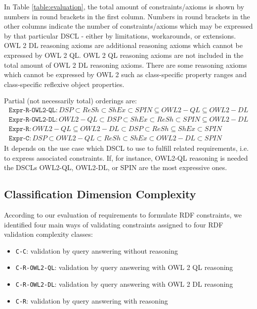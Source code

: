 \documentclass{llncs}
\newcommand{\ms}[1]{\texttt{#1}}
\begin{document}
In Table \ref{table:evaluation}, the total amount of constraints/axioms is shown by numbers in round brackets in the first column.
Numbers in round brackets in the other columns indicate the number of constraints/axioms which may be expressed by that particular DSCL - either by limitations, workarounds, or extensions.  
OWL 2 DL reasoning axioms are additional reasoning axioms which cannot be expressed by OWL 2 QL. 
OWL 2 QL reasoning axioms are not included in the total amount of OWL 2 DL reasoning axioms.
There are some reasoning axioms which cannot be expressed by OWL 2 such as class-specific property ranges and class-specific reflexive object properties.

Partial (not necessarily total) orderings are:
\begin{eqnarray*}
\ms{Expr-R-OWL2-QL}: DSP \subset ReSh \subset ShEx \subset SPIN \subseteq OWL2-QL \subseteq OWL2-DL \\
\ms{Expr-R-OWL2-DL}: OWL2-QL \subset DSP \subset ShEx \subset ReSh \subset SPIN \subseteq OWL2-DL \\
\ms{Expr-R}: OWL2-QL \subseteq OWL2-DL \subset DSP \subset ReSh \subseteq ShEx \subset SPIN \\
\ms{Expr-C}: DSP \subset OWL2-QL \subset ReSh \subset ShEx \subset OWL2-DL \subset SPIN
\end{eqnarray*}
It depends on the use case which DSCL to use to fulfill related requirements, i.e. to express associated constraints.
If, for instance, OWL2-QL reasoning is needed the DSCLs OWL2-QL, OWL2-DL, or SPIN are the most expressive ones.

\subsection{Classification Dimension Complexity}

According to our evaluation of requirements to formulate RDF constraints, we identified four main ways of validating constraints assigned to four RDF validation complexity classes:

\begin{itemize}
	\item \ms{C-C}: validation by query answering without reasoning
	\item \ms{C-R-OWL2-QL}: validation by query answering with OWL 2 QL reasoning
	\item \ms{C-R-OWL2-DL}: validation by query answering with OWL 2 DL reasoning
	\item \ms{C-R}: validation by query answering with reasoning
\end{itemize}
\end{document}
